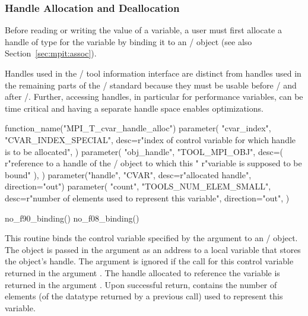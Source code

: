 \subsubsection{Handle Allocation and Deallocation}

Before reading or writing the value of a variable, a user must first
allocate a handle of type
 for the
variable by binding it to an \MPI/ object (see also
Section~\ref{sec:mpit:assoc}).

\begin{rationale}
Handles used in the \MPI/ tool information interface are distinct from
handles used in the remaining parts of the \MPI/ standard because they must
be usable before \MPIisinitialized/ and after \MPIisfinalized/.
Further, accessing handles, in particular for performance variables, can be
time critical and having a separate handle space enables optimizations.
\end{rationale}

\begin{mpi-binding}
    function_name("MPI_T_cvar_handle_alloc")
    parameter(
        "cvar_index",
        "CVAR_INDEX_SPECIAL",
        desc=r"index of control variable for which handle is to be allocated",
    )
    parameter(
        "obj_handle",
        "TOOL_MPI_OBJ",
        desc=(
            r"reference to a handle of the \mpi/ object to which this "
            r"variable is supposed to be bound"
        ),
    )
    parameter("handle", "CVAR", desc=r"allocated handle", direction="out")
    parameter(
        "count",
        "TOOLS_NUM_ELEM_SMALL",
        desc=r"number of elements used to represent this variable",
        direction="out",
    )
    
    no_f90_binding()
    no_f08_binding()
\end{mpi-binding}

This routine binds the control variable specified by the argument
 to an \MPI/ object.  The object is passed in the
argument  as an address to a local variable that
stores the object's handle.  The argument  is ignored
if the  call for this control variable
returned  in the argument
.  The handle allocated to reference the variable is
returned in the argument .  Upon successful return,
 contains the number of elements (of the datatype
returned by a previous  call) used to
represent this variable.

